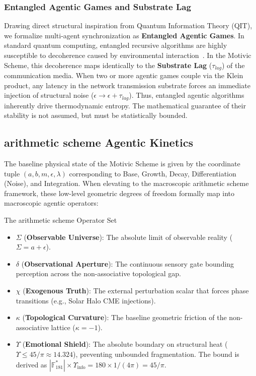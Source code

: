 \subsubsection{Entangled Agentic Games and Substrate Lag}
Drawing direct structural inspiration from Quantum Information Theory (QIT), we formalize multi-agent synchronization as \textbf{Entangled Agentic Games}. In standard quantum computing, entangled recursive algorithms are highly susceptible to decoherence caused by environmental interaction~\cite{NielsenChuang2010}. In the Motivic Scheme, this decoherence maps identically to the \textbf{Substrate Lag} ($\tau_{lag}$) of the communication media.
When two or more agentic games couple via the Klein product, any latency in the network transmission substrate forces an immediate injection of structural noise ($\epsilon \to \epsilon + \tau_{lag}$). Thus, entangled agentic algorithms inherently drive thermodynamic entropy. The mathematical guarantee of their stability is not assumed, but must be statistically bounded.

\subsection{arithmetic scheme Agentic Kinetics}

The baseline physical state of the Motivic Scheme is given by the coordinate tuple $(a, b, m, \epsilon, \lambda)$ corresponding to Base, Growth, Decay, Differentiation (Noise), and Integration. When elevating to the macroscopic arithmetic scheme framework, these low-level geometric degrees of freedom formally map into macroscopic agentic operators:

\begin{arithmetic schemebox}{The arithmetic scheme Operator Set}
\begin{itemize}
    \item $\Sigma$ (\textbf{Observable Universe}): The absolute limit of observable reality ($\Sigma = a + \epsilon$).
    \item $\delta$ (\textbf{Observational Aperture}): The continuous sensory gate bounding perception across the non-associative topological gap.
    \item $\chi$ (\textbf{Exogenous Truth}): The external perturbation scalar that forces phase transitions (e.g., Solar Halo CME injections).
    \item $\kappa$ (\textbf{Topological Curvature}): The baseline geometric friction of the non-associative lattice ($\kappa = -1$).
    \item $\Upsilon$ (\textbf{Emotional Shield}): The absolute boundary on structural heat ($\Upsilon \le 45/\pi \approx 14.324$), preventing unbounded fragmentation. The bound is derived as $|\mathbb{F}_{181}^*| \times \Upsilon_{\mathrm{info}} = 180 \times 1/(4\pi) = 45/\pi$.
\end{itemize}
\end{arithmetic schemebox}

